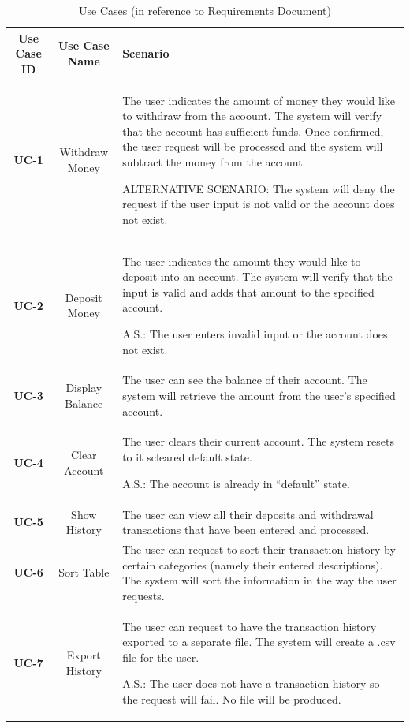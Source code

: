 \documentclass[12pt]{article}
\begin{document}
\begin{table}[H]\label{uc}
  \caption{Use Cases (in reference to Requirements Document)}
  \begin{center}
    \begin{tabular}[\textwidth]{|c|c|p{8cm}|}
      \hline
          {\bf Use Case ID} & {\bf Use Case Name} & {\bf Scenario}\\
          \hline
              {\bf UC-1} & Withdraw Money & The user indicates the amount of money they would like to withdraw from the acoount. The system will verify that the account has sufficient funds. Once confirmed, the user request will be processed and the system will subtract the money from the account.

              ALTERNATIVE SCENARIO: The system will deny the request if the user input is not valid or the account does not exist.\\\hline
              
              {\bf UC-2} & Deposit Money & The user indicates the amount they would like to deposit into an account. The system will verify that the input is valid and adds that amount to the specified account.

              A.S.: The user enters invalid input or the account does not exist.\\\hline
              {\bf UC-3} & Display Balance & The user can see the balance of their account. The system will retrieve the amount from the user's specified account.\\\hline
              {\bf UC-4} & Clear Account & The user clears their current account. The system resets to it scleared default state.

              A.S.: The account is already in ``default'' state.\\\hline

              {\bf UC-5} & Show History & The user can view all their deposits and withdrawal transactions that have been entered and processed.\\\hline

              {\bf UC-6} & Sort Table & The user can request to sort their transaction history by certain categories (namely their entered descriptions). The system will sort the information in the way the user requests.\\\hline

                {\bf UC-7} & Export History & The user can request to have the transaction history exported to a separate file. The system will create a .csv file for the user.

                A.S.: The user does not have a transaction history so the request will fail. No file will be produced.\\\hline

    \end{tabular}
  \end{center}
\end{table}
\end{document}
